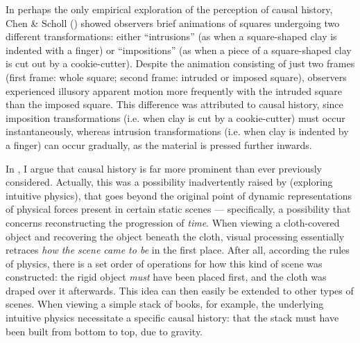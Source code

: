 In perhaps the only empirical exploration of the perception of causal history, Chen \& Scholl (\citeyear{chen_perception_2016}) showed observers brief animations of squares undergoing two different transformations: either “intrusions” (as when a square-shaped clay is indented with a finger) or “impositions” (as when a piece of a square-shaped clay is cut out by a cookie-cutter). Despite the animation consisting of just two frames (first frame: whole square; second frame: intruded or imposed square), observers experienced illusory apparent motion more frequently with the intruded square than the imposed square. This difference was attributed to causal history, since imposition transformations (i.e. when clay is cut by a cookie-cutter) must occur instantaneously, whereas intrusion transformations (i.e. when clay is indented by a finger) can occur gradually, as the material is pressed further inwards.\footnotemark


In , I argue that causal history is far more prominent than ever previously considered. Actually, this was a possibility inadvertently raised by  (exploring intuitive physics), that goes beyond the original point of dynamic representations of physical forces present in certain static scenes --- specifically, a possibility that concerns reconstructing the progression of \textit{time}. When viewing a cloth-covered object and recovering the object beneath the cloth, visual processing essentially retraces \textit{how the scene came to be} in the first place.  After all, according the rules of physics, there is a set order of operations for how this kind of scene was constructed: the rigid object \textit{must} have been placed first, and the cloth was draped over it afterwards.  This idea can then easily be extended to other types of scenes.  When viewing a simple stack of books, for example, the underlying intuitive physics necessitate a specific causal history: that the stack must have been built from bottom to top, due to gravity. 

